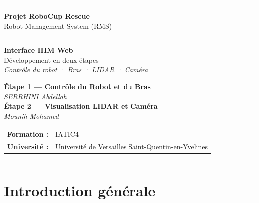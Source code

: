 \documentclass[12pt,a4paper]{report}
\begin{document}
\begin{titlepage}
\centering
\vspace*{1cm}

{\color{secondary}\rule{\linewidth}{1.5pt}}
\vspace{0.5cm}

{\Huge\bfseries\color{secondary} Projet RoboCup Rescue}\\[0.4cm]
{\LARGE\color{primary} Robot Management System (RMS)}\\[0.8cm]

{\color{secondary}\rule{\linewidth}{0.8pt}}
\vspace{0.8cm}

{\huge\bfseries Interface IHM Web}\\[0.3cm]
{\Large Développement en deux étapes}\\[0.3cm]
{\large\color{codegray}\textit{Contrôle du robot · Bras · LIDAR · Caméra}}

\vspace{1.5cm}

\begin{tcolorbox}[colback=lightbg,colframe=primary,width=0.85\textwidth]
\centering
\textbf{Étape 1 — Contrôle du Robot et du Bras}\\
\textit{SERRHINI Abdellah}\\[0.6cm]
\textbf{Étape 2 — Visualisation LIDAR et Caméra}\\
\textit{Mounih Mohamed}
\end{tcolorbox}

\vspace{1.5cm}

{\large
\begin{tabular}{rl}
\textbf{Formation :}   & IATIC4 \\
\textbf{Université :}  & Université de Versailles Saint-Quentin-en-Yvelines \\
\end{tabular}
}

\vfill
{\color{secondary}\rule{\linewidth}{1.5pt}}
\end{titlepage}

\tableofcontents
\clearpage

\chapter*{Introduction générale}
\end{document}
